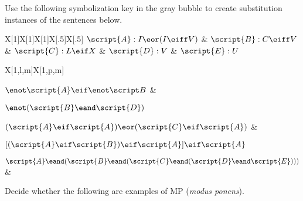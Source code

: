 \noindent\problempart Use the following symbolization key in the gray bubble to create substitution instances of the sentences below.

\begin{mdframed}[style=mytablebox] 
\begin{longtabu}{X[1]X[1]X[1]X[.5]X[.5]} 
$\script{A}: I \eor (I \eiff V)  $ 
&	$\script{B}: C \eiff V$ 
&	$\script{C}: L \eif X$  
&	$\script{D}: V$  
&	$\script{E}: U$ 
\end{longtabu}
\end{mdframed}

\begin{exercises}
\begin{longtabu}{X[1,l,m]X[1,p,m]} 
\item $\enot \script{A} \eif \enot \script B$ 
&
\item $\enot(\script{B} \eand \script{D})$ 
\\
\item $(\script{A} \eif \script{A}) \eor (\script{C} \eif \script{A})$ 
&
\item $[(\script{A} \eif \script{B}) \eif \script{A}] \eif \script{A}$ 
\\
\item $\script{A} \eand (\script{B} \eand (\script{C} \eand (\script{D} \eand \script{E})))$
&\\
\end{longtabu}
\end{exercises}



\noindent\problempart \label{sec4.1partC} Decide whether the following are examples of MP (\emph{modus ponens}).

